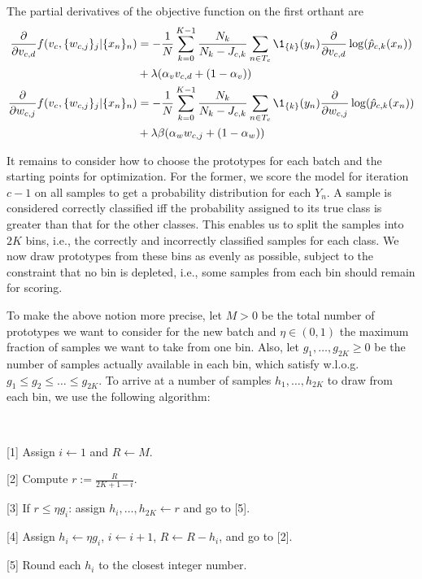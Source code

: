 %
The partial derivatives of the objective function on the first orthant are
%
\begin{align}
\frac{\partial}{\partial v_{c,d}}f(v_c,\{w_{c,j}\}_j|\{x_n\}_n)
&=-\frac{1}{N}\sum_{k=0}^{K-1}\frac{N_k}{N_k-J_{c,k}}\sum_{n\in T_c}
\1_{\{k\}}(y_n)\frac{\partial}{\partial v_{c,d}}\log(\hat{p}_{c,k}(x_n))
\label{eq_l_partial_v}\\
&+\lambda(\alpha_v v_{c,d}+(1-\alpha_v))\notag\\
\frac{\partial}{\partial w_{c,j}}f(v_c,\{w_{c,j}\}_j|\{x_n\}_n)
&=-\frac{1}{N}\sum_{k=0}^{K-1}\frac{N_k}{N_k-J_{c,k}}\sum_{n\in T_c}
\1_{\{k\}}(y_n)\frac{\partial}{\partial w_{c,j}}\log(\hat{p}_{c,k}(x_n))
\label{eq_l_partial_w}\\
&+\lambda\beta(\alpha_w w_{c,j}+(1-\alpha_w))\notag
\end{align}
%
\begin{center}\end{center}
%
It remains to consider how to choose the prototypes for each batch and the starting points for optimization.
For the former, we score the model for iteration $c-1$ on all samples to get a probability distribution for each $Y_n$.
A sample is considered correctly classified iff the probability assigned to its true class is greater than that for the other classes.
This enables us to split the samples into $2K$ bins, i.e., the correctly and incorrectly classified samples for each class.
We now draw prototypes from these bins as evenly as possible, subject to the constraint that no bin is depleted, i.e., some samples from each bin should remain for scoring.\par
%
To make the above notion more precise, let $M>0$ be the total number of prototypes we want to consider for the new batch and $\eta\in(0,1)$ the  maximum fraction of samples we want to take from one bin.
Also, let $g_1,\dots, g_{2K}\geq0$ be the number of samples actually available in each bin, which satisfy w.l.o.g.\ $g_1\leq g_2\leq\dots\leq g_{2K}$.
To arrive at a number of samples $h_1,\dots,h_{2K}$ to draw from each bin, we use the following algorithm:
%
\begin{samepage}
\begin{algorithm}~
\label{alg_bins}
%
\begin{description}
\item{[1]} Assign $i\leftarrow1$ and $R\leftarrow M$.
%
\item{[2]} Compute $r:=\frac{R}{2K+1-i}$.
%
\item{[3]} If $r\leq\eta g_i$: assign $h_i,\dots,h_{2K}\leftarrow r$ and go to [5].
%
\item{[4]} Assign $h_i\leftarrow\eta g_i$, $i\leftarrow i+1$, $R\leftarrow R-h_i$, and go to [2].
%
\item{[5]} Round each $h_i$ to the closest integer number.
\end{description}
\end{algorithm}
\end{samepage}
